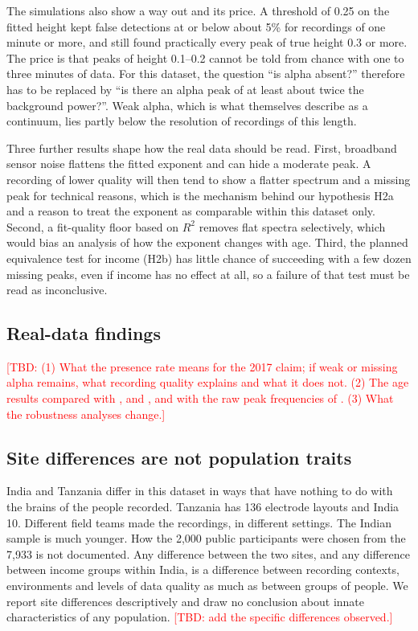 \documentclass[11pt,a4paper]{article}
\newcommand{\TBD}[1]{\textcolor{red}{[TBD: #1]}}
\begin{document}
The simulations also show a way out and its price. A threshold of 0.25 on the fitted
height kept false detections at or below about 5\% for recordings of one minute or more,
and still found practically every peak of true height 0.3 or more. The price is that peaks
of height 0.1--0.2 cannot be told from chance with one to three minutes of data. For this
dataset, the question ``is alpha absent?'' therefore has to be replaced by ``is there an
alpha peak of at least about twice the background power?''. Weak alpha, which is what
\citet{parameshwaran2017} themselves describe as a continuum, lies partly below the
resolution of recordings of this length.

Three further results shape how the real data should be read. First, broadband sensor
noise flattens the fitted exponent and can hide a moderate peak. A recording of lower
quality will then tend to show a flatter spectrum and a missing peak for technical
reasons, which is the mechanism behind our hypothesis H2a and a reason to treat the
exponent as comparable within this dataset only. Second, a fit-quality floor based on
$R^2$ removes flat spectra selectively, which would bias an analysis of how the exponent
changes with age. Third, the planned equivalence test for income (H2b) has little chance
of succeeding with a few dozen missing peaks, even if income has no effect at all, so a
failure of that test must be read as inconclusive.

\subsection{Real-data findings}
\TBD{(1) What the presence rate means for the 2017 claim; if weak or missing alpha
remains, what recording quality explains and what it does not. (2) The age results
compared with \citet{merkin2023}, \citet{cesnaite2023} and \citet{trondle2023}, and with
the raw peak frequencies of \citet{vianney2025}. (3) What the robustness analyses change.}

\subsection{Site differences are not population traits}

India and Tanzania differ in this dataset in ways that have nothing to do with the brains
of the people recorded. Tanzania has 136 electrode layouts and India 10. Different field
teams made the recordings, in different settings. The Indian sample is much younger. How
the 2,000 public participants were chosen from the 7,933 is not documented. Any difference
between the two sites, and any difference between income groups within India, is a
difference between recording contexts, environments and levels of data quality as much as
between groups of people. We report site differences descriptively and draw no conclusion
about innate characteristics of any population. \TBD{add the specific differences observed.}
\end{document}
